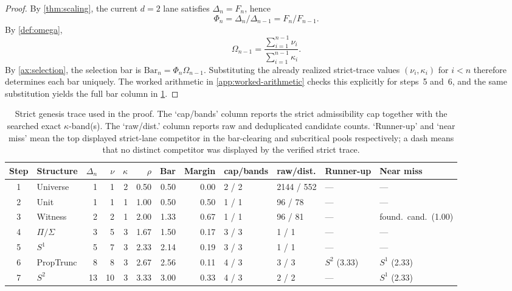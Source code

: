 \documentclass[11pt,a4paper]{article}
\theoremstyle{plain}
\theoremstyle{definition}
\theoremstyle{remark}
\begin{document}
\begin{proof}
By \cref{thm:scaling}, the current $d=2$ lane satisfies $\Delta_n=F_n$, hence
\[
  \Phi_n = \Delta_n/\Delta_{n-1} = F_n/F_{n-1}.
\]
By \cref{def:omega},
\[
  \Omega_{n-1} = \frac{\sum_{i=1}^{n-1}\nu_i}{\sum_{i=1}^{n-1}\kappa_i}.
\]
By \cref{ax:selection}, the selection bar is
$\mathrm{Bar}_n = \Phi_n \Omega_{n-1}$.
Substituting the already realized strict-trace values
$(\nu_i,\kappa_i)$ for $i<n$ therefore determines each bar uniquely.
The worked arithmetic in \cref{app:worked-arithmetic} checks this explicitly for
steps~5 and~6, and the same substitution yields the full bar column in
\cref{tab:genesis-sequence-trace}.
\end{proof}

\begin{table}[tbp]
\centering
\caption{Strict genesis trace used in the proof.
The `cap/bands' column reports the strict admissibility cap together with the
searched exact $\kappa$-band(s).
The `raw/dist.' column reports raw and deduplicated candidate counts.
`Runner-up' and `near miss' mean the top displayed strict-lane competitor in the
bar-clearing and subcritical pools respectively; a dash means that no distinct
competitor was displayed by the verified strict trace.}
\label{tab:genesis-sequence-trace}
\tiny
\setlength{\tabcolsep}{2pt}
\begin{tabular}{@{}c l r r r r r r l l >{\raggedright\arraybackslash}p{1.6cm} >{\raggedright\arraybackslash}p{1.6cm}@{}}
\toprule
Step & Structure & $\Delta_n$ & $\nu$ & $\kappa$ & $\rho$ & Bar & Margin & cap/bands & raw/dist. & Runner-up & Near miss \\
\midrule
1  & Universe    & 1   & 1  & 2 & 0.50 & 0.50 & 0.00 & 2 / 2   & 2144 / 552 & --- & --- \\
2  & Unit        & 1   & 1  & 1 & 1.00 & 0.50 & 0.50 & 1 / 1   & 96 / 78    & --- & --- \\
3  & Witness     & 2   & 2  & 1 & 2.00 & 1.33 & 0.67 & 1 / 1   & 96 / 81    & --- & found.\ cand.\ (1.00) \\
4  & $\Pi/\Sigma$ & 3  & 5  & 3 & 1.67 & 1.50 & 0.17 & 3 / 3   & 1 / 1      & --- & --- \\
5  & $S^1$       & 5   & 7  & 3 & 2.33 & 2.14 & 0.19 & 3 / 3   & 1 / 1      & --- & --- \\
6  & PropTrunc   & 8   & 8  & 3 & 2.67 & 2.56 & 0.11 & 4 / 3   & 3 / 3      & $S^2$ (3.33) & $S^1$ (2.33) \\
7  & $S^2$       & 13  & 10 & 3 & 3.33 & 3.00 & 0.33 & 4 / 3   & 2 / 2      & --- & $S^1$ (2.33) \\

\end{tabular}
\end{table}
\end{document}
